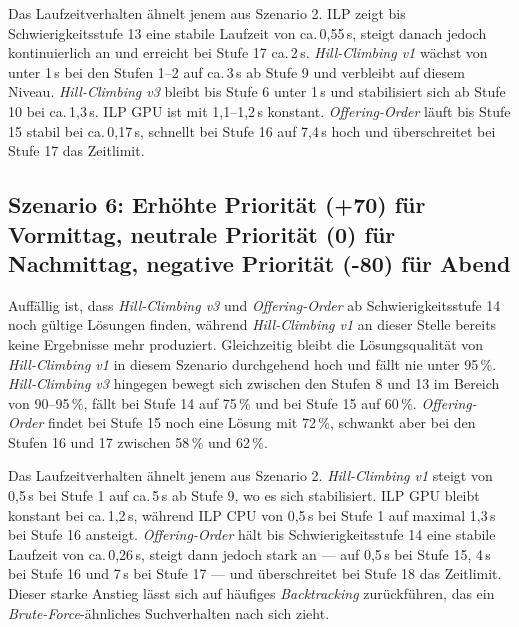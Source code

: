 \vspace{1cm}

\newpage

Das Laufzeitverhalten ähnelt jenem aus Szenario 2. ILP zeigt bis Schwierigkeitsstufe 13 eine
stabile Laufzeit von ca.\,0{,}55\,s, steigt danach jedoch kontinuierlich an und erreicht bei
Stufe 17 ca.\,2\,s. \textit{Hill-Climbing v1} wächst von unter 1\,s bei den Stufen 1--2 auf
ca.\,3\,s ab Stufe 9 und verbleibt auf diesem Niveau. \textit{Hill-Climbing v3} bleibt bis
Stufe 6 unter 1\,s und stabilisiert sich ab Stufe 10 bei ca.\,1{,}3\,s. ILP GPU ist mit
1{,}1--1{,}2\,s konstant. \textit{Offering-Order} läuft bis Stufe 15 stabil bei ca.\,0{,}17\,s,
schnellt bei Stufe 16 auf 7{,}4\,s hoch und überschreitet bei Stufe 17 das Zeitlimit.

\vspace{1cm}

\newpage


\subsection{Szenario 6: Erhöhte Priorität (+70) für Vormittag, neutrale Priorität (0) für Nachmittag, negative Priorität (-80) für Abend}

Auffällig ist, dass \textit{Hill-Climbing v3} und \textit{Offering-Order} ab
Schwierigkeitsstufe 14 noch gültige Lösungen finden, während \textit{Hill-Climbing v1} an
dieser Stelle bereits keine Ergebnisse mehr produziert. Gleichzeitig bleibt die
Lösungsqualität von \textit{Hill-Climbing v1} in diesem Szenario durchgehend hoch und fällt
nie unter 95\,\%. \textit{Hill-Climbing v3} hingegen bewegt sich zwischen den Stufen 8 und 13
im Bereich von 90--95\,\%, fällt bei Stufe 14 auf 75\,\% und bei Stufe 15 auf 60\,\%.
\textit{Offering-Order} findet bei Stufe 15 noch eine Lösung mit 72\,\%, schwankt aber bei
den Stufen 16 und 17 zwischen 58\,\% und 62\,\%.

\vspace{1cm}

\newpage

Das Laufzeitverhalten ähnelt jenem aus Szenario 2. \textit{Hill-Climbing v1} steigt von
0{,}5\,s bei Stufe 1 auf ca.\,5\,s ab Stufe 9, wo es sich stabilisiert. ILP GPU bleibt
konstant bei ca.\,1{,}2\,s, während ILP CPU von 0{,}5\,s bei Stufe 1 auf maximal 1{,}3\,s bei
Stufe 16 ansteigt. \textit{Offering-Order} hält bis Schwierigkeitsstufe 14 eine stabile
Laufzeit von ca.\,0{,}26\,s, steigt dann jedoch stark an --- auf 0{,}5\,s bei Stufe 15, 4\,s
bei Stufe 16 und 7\,s bei Stufe 17 --- und überschreitet bei Stufe 18 das Zeitlimit. Dieser
starke Anstieg lässt sich auf häufiges \textit{Backtracking} zurückführen, das ein
\textit{Brute-Force}-ähnliches Suchverhalten nach sich zieht.

